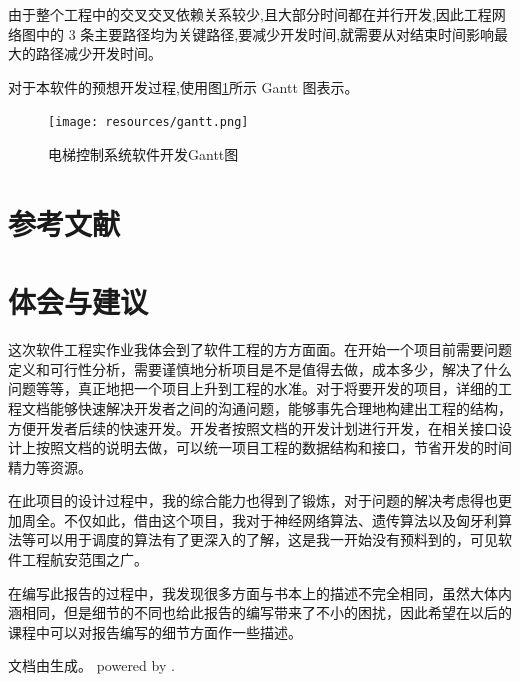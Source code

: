 由于整个工程中的交叉交叉依赖关系较少,且大部分时间都在并行开发,因此工程网络图中的 3 条主要路径均为关键路径,要减少开发时间,就需要从对结束时间影响最大的路径减少开发时间。\par

对于本软件的预想开发过程,使用图\ref{fig:gantt}所示 Gantt 图表示。
\begin{figure}[H]
	\centering
	\texttt{[image: resources/gantt.png]}
	\caption{电梯控制系统软件开发Gantt图}
	\label{fig:gantt}
\end{figure}



\newpage

\appendix

\section{参考文献}
\printbibliography[heading=none]			%

\newpage
\section{体会与建议}
这次软件工程实作业我体会到了软件工程的方方面面。在开始一个项目前需要问题定义和可行性分析，需要谨慎地分析项目是不是值得去做，成本多少，解决了什么问题等等，真正地把一个项目上升到工程的水准。对于将要开发的项目，详细的工程文档能够快速解决开发者之间的沟通问题，能够事先合理地构建出工程的结构，方便开发者后续的快速开发。开发者按照文档的开发计划进行开发，在相关接口设计上按照文档的说明去做，可以统一项目工程的数据结构和接口，节省开发的时间精力等资源。\par

在此项目的设计过程中，我的综合能力也得到了锻炼，对于问题的解决考虑得也更加周全。不仅如此，借由这个项目，我对于神经网络算法、遗传算法以及匈牙利算法等可以用于调度的算法有了更深入的了解，这是我一开始没有预料到的，可见软件工程航安范围之广。\par

在编写此报告的过程中，我发现很多方面与书本上的描述不完全相同，虽然大体内涵相同，但是细节的不同也给此报告的编写带来了不小的困扰，因此希望在以后的课程中可以对报告编写的细节方面作一些描述。\par

\vfill
\noindent 文档由\XeLaTeX 生成。 \hfill powered by \XeLaTeX.



